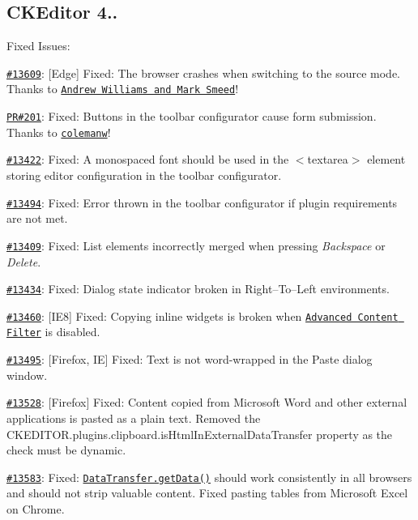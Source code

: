 \subsection*{C\+K\+Editor 4..}

Fixed Issues\+:


\begin{DoxyItemize}
\item \href{http://dev.ckeditor.com/ticket/13609}{\tt \#13609}\+: \mbox{[}Edge\mbox{]} Fixed\+: The browser crashes when switching to the source mode. Thanks to \href{http://webxsolution.com/}{\tt Andrew Williams and Mark Smeed}!
\item \href{https://github.com/ckeditor/ckeditor-dev/pull/201}{\tt PR\#201}\+: Fixed\+: Buttons in the toolbar configurator cause form submission. Thanks to \href{https://github.com/colemanw}{\tt colemanw}!
\item \href{http://dev.ckeditor.com/ticket/13422}{\tt \#13422}\+: Fixed\+: A monospaced font should be used in the {\ttfamily $<$textarea$>$} element storing editor configuration in the toolbar configurator.
\item \href{http://dev.ckeditor.com/ticket/13494}{\tt \#13494}\+: Fixed\+: Error thrown in the toolbar configurator if plugin requirements are not met.
\item \href{http://dev.ckeditor.com/ticket/13409}{\tt \#13409}\+: Fixed\+: List elements incorrectly merged when pressing {\itshape Backspace} or {\itshape Delete}.
\item \href{http://dev.ckeditor.com/ticket/13434}{\tt \#13434}\+: Fixed\+: Dialog state indicator broken in Right–\+To–\+Left environments.
\item \href{http://dev.ckeditor.com/ticket/13460}{\tt \#13460}\+: \mbox{[}I\+E8\mbox{]} Fixed\+: Copying inline widgets is broken when \href{http://docs.ckeditor.com/#!/guide/dev_acf}{\tt Advanced Content Filter} is disabled.
\item \href{http://dev.ckeditor.com/ticket/13495}{\tt \#13495}\+: \mbox{[}Firefox, IE\mbox{]} Fixed\+: Text is not word-\/wrapped in the Paste dialog window.
\item \href{http://dev.ckeditor.com/ticket/13528}{\tt \#13528}\+: \mbox{[}Firefox\mbox{]} Fixed\+: Content copied from Microsoft Word and other external applications is pasted as a plain text. Removed the {\ttfamily C\+K\+E\+D\+I\+T\+O\+R.\+plugins.\+clipboard.\+is\+Html\+In\+External\+Data\+Transfer} property as the check must be dynamic.
\item \href{http://dev.ckeditor.com/ticket/13583}{\tt \#13583}\+: Fixed\+: \href{http://docs.ckeditor.com/#!/api/CKEDITOR.plugins.clipboard.dataTransfer-method-getData}{\tt {\ttfamily Data\+Transfer.\+get\+Data()}} should work consistently in all browsers and should not strip valuable content. Fixed pasting tables from Microsoft Excel on Chrome.

\end{DoxyItemize}
